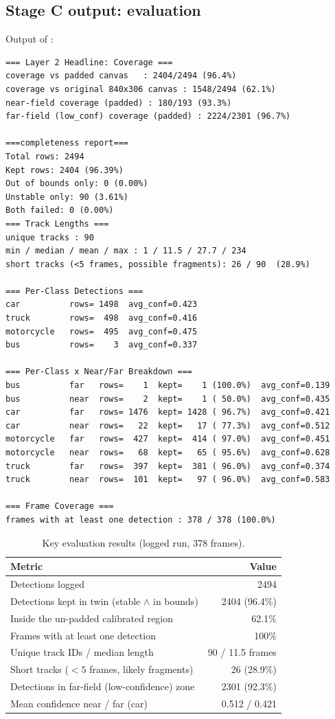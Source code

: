 \documentclass[11pt,a4paper]{article}
\DeclareRobustCommand{\file}[1]{\texttt{\detokenize{#1}}}
\begin{document}
\subsection{Stage C output: evaluation}
Output of \file{eval.py}:
\begin{lstlisting}[style=out]
=== Layer 2 Headline: Coverage ===
coverage vs padded canvas   : 2404/2494 (96.4%)
coverage vs original 840x306 canvas : 1548/2494 (62.1%)
near-field coverage (padded) : 180/193 (93.3%)
far-field (low_conf) coverage (padded) : 2224/2301 (96.7%)

===completeness report===
Total rows: 2494
Kept rows: 2404 (96.39%)
Out of bounds only: 0 (0.00%)
Unstable only: 90 (3.61%)
Both failed: 0 (0.00%)
=== Track Lengths ===
unique tracks : 90
min / median / mean / max : 1 / 11.5 / 27.7 / 234
short tracks (<5 frames, possible fragments): 26 / 90  (28.9%)

=== Per-Class Detections ===
car          rows= 1498  avg_conf=0.423
truck        rows=  498  avg_conf=0.416
motorcycle   rows=  495  avg_conf=0.475
bus          rows=    3  avg_conf=0.337

=== Per-Class x Near/Far Breakdown ===
bus          far   rows=    1  kept=    1 (100.0%)  avg_conf=0.139
bus          near  rows=    2  kept=    1 ( 50.0%)  avg_conf=0.435
car          far   rows= 1476  kept= 1428 ( 96.7%)  avg_conf=0.421
car          near  rows=   22  kept=   17 ( 77.3%)  avg_conf=0.512
motorcycle   far   rows=  427  kept=  414 ( 97.0%)  avg_conf=0.451
motorcycle   near  rows=   68  kept=   65 ( 95.6%)  avg_conf=0.628
truck        far   rows=  397  kept=  381 ( 96.0%)  avg_conf=0.374
truck        near  rows=  101  kept=   97 ( 96.0%)  avg_conf=0.583

=== Frame Coverage ===
frames with at least one detection : 378 / 378 (100.0%)
\end{lstlisting}

\begin{table}[H]
\centering\small
\caption{Key evaluation results (logged run, 378 frames).}
\label{tab:eval}
\begin{tabular}{@{}lr@{}}
\toprule
Metric & Value\\
\midrule
Detections logged & 2494\\
Detections kept in twin (stable $\wedge$ in bounds) & 2404 (96.4\%)\\
Inside the un-padded calibrated region & 62.1\%\\
Frames with at least one detection & 100\%\\
Unique track IDs / median length & 90 / 11.5 frames\\
Short tracks ($<5$ frames, likely fragments) & 26 (28.9\%)\\
Detections in far-field (low-confidence) zone & 2301 (92.3\%)\\
Mean confidence near / far (car) & 0.512 / 0.421\\
\bottomrule
\end{tabular}
\end{table}
\end{document}
